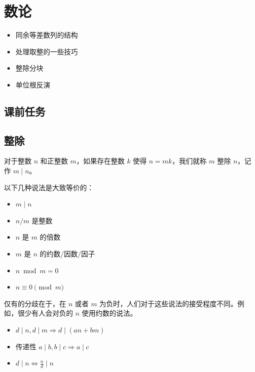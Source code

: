 \chapter{数论}
\begin{overview}
    \begin{itemize}
    \item 同余等差数列的结构
    \item 处理取整的一些技巧
    \item 整除分块
    \item 单位根反演
    \end{itemize}
\end{overview}
\section{课前任务}
    

\section{整除}

\begin{definition}
对于整数 $n$ 和正整数 $m$，如果存在整数 $k$ 使得 $n=mk$，我们就称 $m$ 整除 $n$，记作 $m\mid n$。
\end{definition}
\begin{remark}
    以下几种说法是大致等价的：
    \begin{itemize}
        \item $m\mid n$
        \item $n/m$ 是整数
        \item $n$ 是 $m$ 的倍数
        \item $m$ 是 $n$ 的约数/因数/因子
        \item $n\bmod m=0$
        \item $n\equiv 0\pmod m$
    \end{itemize}
    仅有的分歧在于，在 $n$ 或者 $m$ 为负时，人们对于这些说法的接受程度不同。例如，很少有人会对负的 $n$ 使用约数的说法。
\end{remark}

\begin{property}
    \begin{itemize}
        \item $d\mid n,d\mid m\Rightarrow d\mid (an+bm)$
        \item 传递性 $a\mid b,b\mid c\Rightarrow a\mid c$
        \item $d\mid n\Leftrightarrow \frac{n}{d}\mid n$
    \end{itemize}
\end{property}

